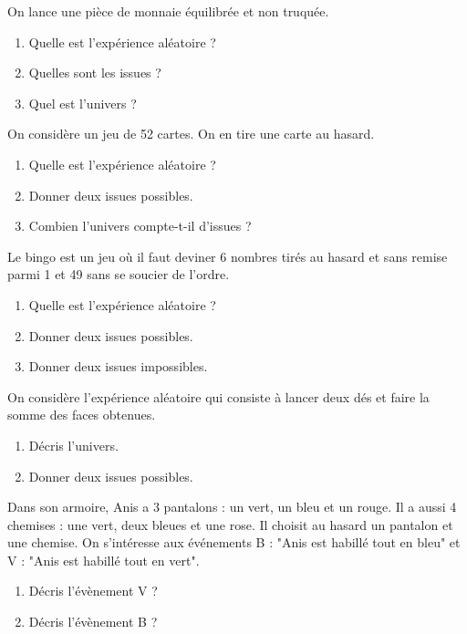 \begin{pageAD} 


 
On lance une pièce de monnaie équilibrée et non truquée.

\begin{enumerate}
\item Quelle est l'expérience aléatoire ? 
\item Quelles sont les issues ?
\item Quel est l'univers ?
\end{enumerate}



On considère un jeu de 52 cartes. On en tire une carte au hasard. 
\begin{enumerate}
\item Quelle est l'expérience aléatoire ?
\item Donner deux issues possibles.
\item Combien l'univers compte-t-il d'issues ?
\end{enumerate}



Le bingo est un jeu où il faut deviner 6 nombres tirés au hasard et sans remise parmi 1 et 49 sans se soucier de l'ordre.
\begin{enumerate}
\item Quelle est l'expérience aléatoire ?
\item Donner deux issues possibles.
\item Donner deux issues impossibles.
\end{enumerate}

 

On considère l'expérience aléatoire qui consiste à lancer deux dés et faire la somme des faces obtenues.
\begin{enumerate}
\item Décris l'univers.
\item Donner deux issues possibles.
\end{enumerate}
 



 

Dans son armoire, Anis a 3 pantalons : un vert, un bleu et un rouge. Il a aussi 4 chemises : une vert, deux bleues et une rose. Il choisit au hasard un pantalon et une chemise. On s'intéresse aux événements B : "Anis est habillé tout en bleu" et V : "Anis est habillé tout en vert".
\begin{enumerate}
\item Décris l'évènement V ? 
\item Décris l'évènement B ? 
\end{enumerate}




\end{pageAD}  




